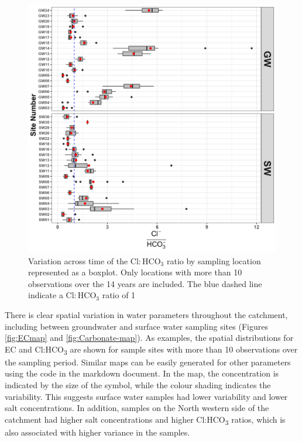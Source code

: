 \documentclass[, manuscript]{copernicus}
\begin{document}
\clearpage

\begin{figure}
\includegraphics[width=0.8\linewidth]{Figures/clhco3_plot} \caption{Variation across time of the $\mathrm{Cl:HCO_3}$ ratio by sampling location represented as a boxplot. Only locations with more than 10 observations over the 14 years are included. The blue dashed line indicate a $\mathrm{Cl:HCO_3}$ ratio of 1}\label{fig:Carbonate-boxplot}
\end{figure}

There is clear spatial variation in water parameters throughout the
catchment, including between groundwater and surface water sampling
sites (Figures \ref{fig:ECmap} and \ref{fig:Carbonate-map}). As
examples, the spatial distributions for EC and Cl:HCO\textsubscript{3}
are shown for sample sites with more than 10 observations over the
sampling period. Similar maps can be easily generated for other
parameters using the code in the markdown document. In the map, the
concentration is indicated by the size of the symbol, while the colour
shading indicates the variability. This suggests surface water samples
had lower variability and lower salt concentrations. In addition,
samples on the North western side of the catchment had higher salt
concentrations and higher Cl:HCO\textsubscript{3} ratios, which is also
associated with higher variance in the samples.
\end{document}
